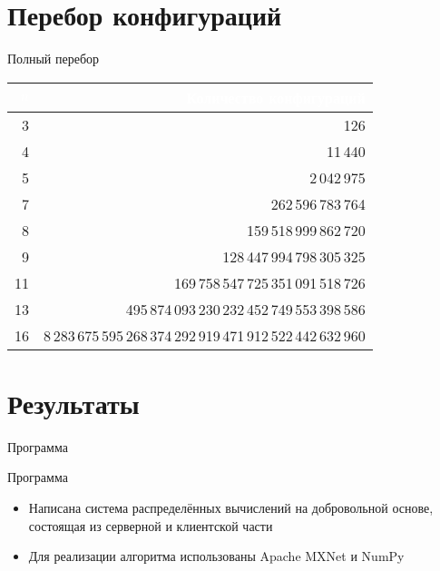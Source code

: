 \documentclass[8pt, hyperref={pdftex,unicode}]{beamer}
\begin{document}
\section{Перебор конфигураций}
\begin{frame}{Полный перебор}

    \centering
    \begin{tabular}{|r|r|}\hline
        \rowcolor{mainColor1}\textcolor{white}{\;$n$\;} & \bf \textcolor{white}{Количество конфигураций}                     \\ \hline
        3                                               & 126                                                                \\ \hline
        4                                               & 11\,440                                                            \\ \hline
        5                                               & 2\,042\,975                                                        \\ \hline
        7                                               & 262\,596\,783\,764                                                 \\ \hline
        8                                               & 159\,518\,999\,862\,720                                            \\ \hline
        9                                               & 128\,447\,994\,798\,305\,325                                       \\ \hline
        11                                              & 169\,758\,547\,725\,351\,091\,518\,726                             \\ \hline
        13                                              & 495\,874\,093\,230\,232\,452\,749\,553\,398\,586                   \\ \hline
        16                                              & 8\,283\,675\,595\,268\,374\,292\,919\,471\,912\,522\,442\,632\,960 \\ \hline
    \end{tabular}

\end{frame}


\section{Результаты}
\begin{frame}{Программа}

    \begin{block}{Программа}
        \begin{itemize}
            \item Написана система распределённых вычислений на добровольной основе, состоящая из серверной и клиентской части
            \item Для реализации алгоритма использованы Apache MXNet и NumPy
        \end{itemize}
    \end{block}

\end{frame}
\end{document}
